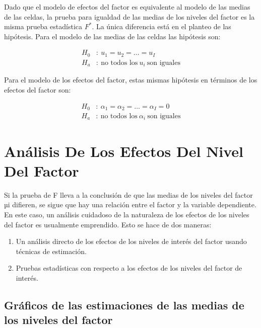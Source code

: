 \documentclass[]{book}
\theoremstyle{definition}
\theoremstyle{definition}
\theoremstyle{definition}
\theoremstyle{remark}
\begin{document}
Dado que el modelo de efectos del factor es equivalente al modelo de las
medias de las celdas, la prueba para igualdad de las medias de los
niveles del factor es la misma prueba estadística \(F^{*}\). La única
diferencia está en el planteo de las hipótesis. Para el modelo de las
medias de las celdas las hipótesis son:

\[
\begin{aligned}
H_{0} &:\ u_{1} = u_{2} = \ldots = u_{I}\\
H_{a} &:\ \text{no todos los}\ u_{i}\ \text{son iguales}
\end{aligned}
\]

Para el modelo de los efectos del factor, estas mismas hipótesis en
términos de los efectos del factor son:

\[
\begin{aligned}
H_{0} &:\ \alpha_{1} = \alpha_{2} = \ldots = \alpha_{I} = 0\\
H_{a} &:\ \text{no todos los}\ \alpha_{i}\ \text{son iguales}
\end{aligned}
\]

\hypertarget{analisis-de-los-efectos-del-nivel-del-factor}{%
\section{Análisis De Los Efectos Del Nivel Del
Factor}\label{analisis-de-los-efectos-del-nivel-del-factor}}

Si la prueba de F lleva a la conclusión de que las medias de los niveles
del factor µi difieren, se sigue que hay una relación entre el factor y
la variable dependiente. En este caso, un análisis cuidadoso de la
naturaleza de los efectos de los niveles del factor es usualmente
emprendido. Esto se hace de dos maneras:

\begin{enumerate}
\def\labelenumi{\arabic{enumi}.}
\item
  Un análisis directo de los efectos de los niveles de interés del
  factor usando técnicas de estimación.
\item
  Pruebas estadísticas con respecto a los efectos de los niveles del
  factor de interés.
\end{enumerate}

\hypertarget{graficos-de-las-estimaciones-de-las-medias-de-los-niveles-del-factor}{%
\subsection{Gráficos de las estimaciones de las medias de los niveles
del
factor}\label{graficos-de-las-estimaciones-de-las-medias-de-los-niveles-del-factor}}
\end{document}
